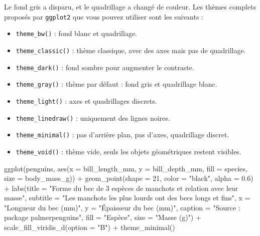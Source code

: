 \documentclass[
  letterpaper,
  DIV=11,
  numbers=noendperiod]{scrreprt}
\newenvironment{Shaded}{\begin{snugshade}}{\end{snugshade}}
\newcommand{\AttributeTok}[1]{\textcolor[rgb]{0.40,0.45,0.13}{#1}}
\newcommand{\DecValTok}[1]{\textcolor[rgb]{0.68,0.00,0.00}{#1}}
\newcommand{\FloatTok}[1]{\textcolor[rgb]{0.68,0.00,0.00}{#1}}
\newcommand{\FunctionTok}[1]{\textcolor[rgb]{0.28,0.35,0.67}{#1}}
\newcommand{\NormalTok}[1]{\textcolor[rgb]{0.00,0.23,0.31}{#1}}
\newcommand{\SpecialCharTok}[1]{\textcolor[rgb]{0.37,0.37,0.37}{#1}}
\newcommand{\StringTok}[1]{\textcolor[rgb]{0.13,0.47,0.30}{#1}}
\providecommand{\tightlist}{%
  \setlength{\itemsep}{0pt}\setlength{\parskip}{0pt}}\usepackage{longtable,booktabs,array}
\begin{document}
Le fond gris a disparu, et le quadrillage a changé de couleur. Les
thèmes complets proposés par \texttt{ggplot2} que vous pouvez utiliser
sont les suivants :

\begin{itemize}
\tightlist
\item
  \texttt{theme\_bw()} : fond blanc et quadrillage.
\item
  \texttt{theme\_classic()} : thème classique, avec des axes mais pas de
  quadrillage.
\item
  \texttt{theme\_dark()} : fond sombre pour augmenter le contraste.
\item
  \texttt{theme\_gray()} : thème par défaut : fond gris et quadrillage
  blanc.
\item
  \texttt{theme\_light()} : axes et quadrillages discrets.
\item
  \texttt{theme\_linedraw()} : uniquement des lignes noires.
\item
  \texttt{theme\_minimal()} : pas d'arrière plan, pas d'axes,
  quadrillage discret.
\item
  \texttt{theme\_void()} : thème vide, seuls les objets géométriques
  restent visibles.
\end{itemize}

\begin{Shaded}
\begin{Highlighting}[]
\FunctionTok{ggplot}\NormalTok{(penguins, }\FunctionTok{aes}\NormalTok{(}\AttributeTok{x =}\NormalTok{ bill\_length\_mm, }\AttributeTok{y =}\NormalTok{ bill\_depth\_mm,}
                     \AttributeTok{fill =}\NormalTok{ species, }\AttributeTok{size =}\NormalTok{ body\_mass\_g)) }\SpecialCharTok{+}
  \FunctionTok{geom\_point}\NormalTok{(}\AttributeTok{shape =} \DecValTok{21}\NormalTok{, }\AttributeTok{color =} \StringTok{"black"}\NormalTok{, }\AttributeTok{alpha =} \FloatTok{0.6}\NormalTok{) }\SpecialCharTok{+}
  \FunctionTok{labs}\NormalTok{(}\AttributeTok{title =} \StringTok{"Forme du bec de 3 espèces de manchots et relation avec leur masse"}\NormalTok{,}
       \AttributeTok{subtitle =} \StringTok{"Les manchots les plus lourds ont des becs longs et fins"}\NormalTok{,}
       \AttributeTok{x =} \StringTok{"Longueur du bec (mm)"}\NormalTok{,}
       \AttributeTok{y =} \StringTok{"Épaisseur du bec (mm)"}\NormalTok{,}
       \AttributeTok{caption =} \StringTok{"Source :  package \textquotesingle{}palmerpenguins\textquotesingle{}"}\NormalTok{,}
       \AttributeTok{fill =} \StringTok{"Espèce"}\NormalTok{,}
       \AttributeTok{size =} \StringTok{"Masse (g)"}\NormalTok{) }\SpecialCharTok{+}
  \FunctionTok{scale\_fill\_viridis\_d}\NormalTok{(}\AttributeTok{option =} \StringTok{"B"}\NormalTok{) }\SpecialCharTok{+}
  \FunctionTok{theme\_minimal}\NormalTok{()}
\end{Highlighting}
\end{Shaded}
\end{document}
